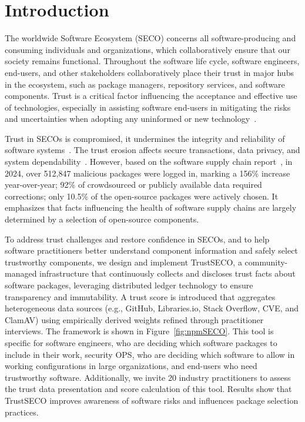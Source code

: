 \documentclass[10pt,conference]{IEEEtran}
\begin{document}
\section{Introduction}
The worldwide Software Ecosystem (SECO) concerns all software-producing and consuming individuals and organizations, which collaboratively ensure that our society remains functional. Throughout the software life cycle, software engineers, end-users, and other stakeholders collaboratively place their trust in major hubs in the ecosystem, such as package managers, repository services, and software components. Trust is a critical factor influencing the acceptance and effective use of technologies, especially in assisting software end-users in mitigating the risks and uncertainties when adopting any uninformed or new technology~\cite{pavlou2002institution}.


Trust in SECOs is compromised, it undermines the integrity and reliability of software systems~\cite{hatcliff2014certifiably}. The trust erosion affects secure transactions, data privacy, and system dependability~\cite{pearson2010privacy}. However, based on the software supply chain report~\cite{Sonatype2024OSS}, in 2024, over 512,847 malicious packages were logged in, marking a 156\% increase year-over-year; 92\% of crowdsourced or publicly available data required corrections; only 10.5\% of the open-source packages were actively chosen. It emphasizes that facts influencing the health of software supply chains are largely determined by a selection of open-source components.

To address trust challenges and restore confidence in SECOs, and to help software practitioners better understand component information and safely select trustworthy components, we design and implement TrustSECO, a community-managed infrastructure that continuously collects and discloses trust facts about software packages, leveraging distributed ledger technology to ensure transparency and immutability. A trust score is introduced that aggregates heterogeneous data sources (e.g., GitHub, Libraries.io, Stack Overflow, CVE, and ClamAV) using empirically derived weights refined through practitioner interviews. The framework is shown in Figure~\ref{fig:npmSECO}. This tool is specific for software engineers, who are deciding which software packages to include in their work, security OPS, who are deciding which software to allow in working configurations in large organizations, and end-users who need trustworthy software. Additionally, we invite 20 industry practitioners to assess the trust data presentation and score calculation of this tool. Results show that TrustSECO improves awareness of software risks and influences package selection practices.
\end{document}
